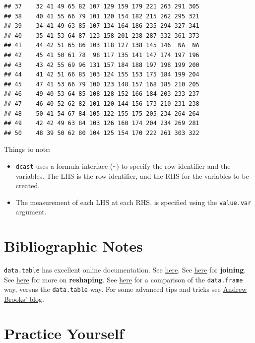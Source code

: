 \documentclass[]{book}
\providecommand{\tightlist}{%
  \setlength{\itemsep}{0pt}\setlength{\parskip}{0pt}}
\theoremstyle{definition}
\theoremstyle{definition}
\theoremstyle{definition}
\theoremstyle{remark}
\begin{document}
\begin{verbatim}
## 37    32 41 49 65 82 107 129 159 179 221 263 291 305
## 38    40 41 55 66 79 101 120 154 182 215 262 295 321
## 39    34 41 49 63 85 107 134 164 186 235 294 327 341
## 40    35 41 53 64 87 123 158 201 238 287 332 361 373
## 41    44 42 51 65 86 103 118 127 138 145 146  NA  NA
## 42    45 41 50 61 78  98 117 135 141 147 174 197 196
## 43    43 42 55 69 96 131 157 184 188 197 198 199 200
## 44    41 42 51 66 85 103 124 155 153 175 184 199 204
## 45    47 41 53 66 79 100 123 148 157 168 185 210 205
## 46    49 40 53 64 85 108 128 152 166 184 203 233 237
## 47    46 40 52 62 82 101 120 144 156 173 210 231 238
## 48    50 41 54 67 84 105 122 155 175 205 234 264 264
## 49    42 42 49 63 84 103 126 160 174 204 234 269 281
## 50    48 39 50 62 80 104 125 154 170 222 261 303 322
\end{verbatim}

Things to note:

\begin{itemize}
\tightlist
\item
  \texttt{dcast} uses a formula interface (\texttt{\textasciitilde{}})
  to specify the row identifier and the variables. The LHS is the row
  identifier, and the RHS for the variables to be created.
\item
  The measurement of each LHS at each RHS, is specified using the
  \texttt{value.var} argument.
\end{itemize}

\section{Bibliographic Notes}\label{bibliographic-notes-2}

\texttt{data.table} has excellent online documentation. See
\href{https://cran.r-project.org/web/packages/data.table/vignettes/datatable-intro.html}{here}.
See
\href{https://rstudio-pubs-static.s3.amazonaws.com/52230_5ae0d25125b544caab32f75f0360e775.html}{here}
for \textbf{joining}. See
\href{https://cran.r-project.org/web/packages/data.table/vignettes/datatable-reshape.html}{here}
for more on \textbf{reshaping}. See
\href{https://www.r-bloggers.com/intro-to-the-data-table-package/}{here}
for a comparison of the \texttt{data.frame} way, versus the
\texttt{data.table} way. For some advanced tips and tricks see
\href{http://brooksandrew.github.io/simpleblog/articles/advanced-data-table/}{Andrew
Brooks' blog}.

\section{Practice Yourself}\label{practice-yourself-1}
\end{document}
